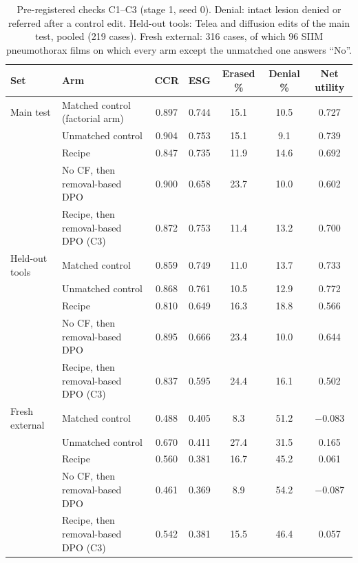 \documentclass[11pt]{article}
\begin{document}
\begin{table}[t]
\centering\footnotesize\setlength{\tabcolsep}{3.5pt}
\caption{Pre-registered checks C1--C3 (stage 1, seed 0). Denial: intact lesion denied or referred after a control edit. Held-out tools: Telea and diffusion edits of the main test, pooled (219 cases). Fresh external: 316 cases, of which 96 SIIM pneumothorax films on which every arm except the unmatched one answers ``No''.}
\label{tab:v5}
\begin{tabular}{llccccc}
\toprule
Set & Arm & CCR & ESG & Erased \% & Denial \% & Net utility \\
\midrule
Main test & Matched control (factorial arm) & 0.897 & 0.744 & 15.1 & 10.5 & 0.727 \\
 & Unmatched control & 0.904 & 0.753 & 15.1 & 9.1 & 0.739 \\
 & Recipe & 0.847 & 0.735 & 11.9 & 14.6 & 0.692 \\
 & No CF, then removal-based DPO & 0.900 & 0.658 & 23.7 & 10.0 & 0.602 \\
 & Recipe, then removal-based DPO (C3) & 0.872 & 0.753 & 11.4 & 13.2 & 0.700 \\
\midrule
Held-out tools & Matched control & 0.859 & 0.749 & 11.0 & 13.7 & 0.733 \\
 & Unmatched control & 0.868 & 0.761 & 10.5 & 12.9 & 0.772 \\
 & Recipe & 0.810 & 0.649 & 16.3 & 18.8 & 0.566 \\
 & No CF, then removal-based DPO & 0.895 & 0.666 & 23.4 & 10.0 & 0.644 \\
 & Recipe, then removal-based DPO (C3) & 0.837 & 0.595 & 24.4 & 16.1 & 0.502 \\
\midrule
Fresh external & Matched control & 0.488 & 0.405 & 8.3 & 51.2 & $-$0.083 \\
 & Unmatched control & 0.670 & 0.411 & 27.4 & 31.5 & 0.165 \\
 & Recipe & 0.560 & 0.381 & 16.7 & 45.2 & 0.061 \\
 & No CF, then removal-based DPO & 0.461 & 0.369 & 8.9 & 54.2 & $-$0.087 \\
 & Recipe, then removal-based DPO (C3) & 0.542 & 0.381 & 15.5 & 46.4 & 0.057 \\
\bottomrule
\end{tabular}
\end{table}
\end{document}
